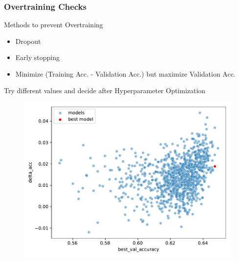 \documentclass[8pt]{beamer}
\begin{document}
\begin{frame}
    \frametitle{Overtraining Checks}
    \begin{alertblock}{Methods to prevent Overtraining}
        \begin{itemize}
            \item Dropout
            \item Early stopping
            \item Minimize (Training Acc. - Validation Acc.)
            \alert{but} maximize Validation Acc.
        \end{itemize}
    Try different values and decide after Hyperparameter Optimization
    \end{alertblock}
    \begin{figure}
        \includegraphics[scale=0.45]{figures/HPO_scatter.pdf}
    \end{figure}
\end{frame}
\end{document}

